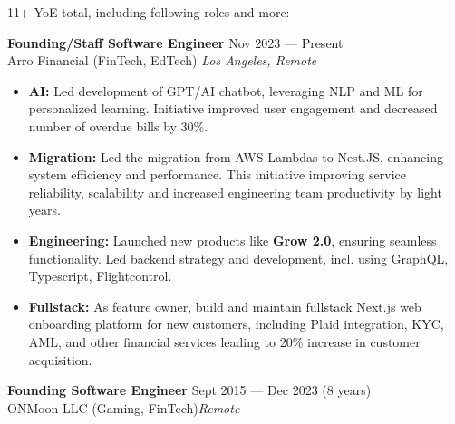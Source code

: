 \documentclass{template}
\begin{document}
\begin{rSection}{11+ YoE total, including following roles and more:}

\textbf{Founding/Staff Software Engineer} \hfill Nov 2023 --- Present\\
Arro Financial (FinTech, EdTech) \hfill \textit{Los Angeles, Remote}
\begin{minipage}{0.95\textwidth}
 \begin{itemize}
    \footnotesize
    \vspace{0.1cm}
    \itemsep 1pt {}  
    \item \textbf{AI:} Led development of GPT/AI chatbot, leveraging NLP and ML for personalized learning. Initiative improved user engagement and decreased number of overdue bills by 30\%.
    \item \textbf{Migration:} Led the migration from AWS Lambdas to Nest.JS, enhancing system efficiency and performance. This initiative improving service reliability, scalability and increased engineering team productivity by light years.
    \item \textbf{Engineering:} Launched new products like \textbf{Grow 2.0}, ensuring seamless functionality. Led backend strategy and development, incl. using GraphQL, Typescript, Flightcontrol.
    \item \textbf{Fullstack:} As feature owner, build and maintain fullstack Next.js web onboarding platform for new customers, including Plaid integration, KYC, AML, and other financial services leading to 20\% increase in customer acquisition.
 \end{itemize}
\end{minipage}

\textbf{Founding Software Engineer} \hfill Sept 2015 --- Dec 2023 (8 years)\\
ONMoon LLC (Gaming, FinTech)\hfill \textit{Remote}


\end{rSection}
\end{document}
